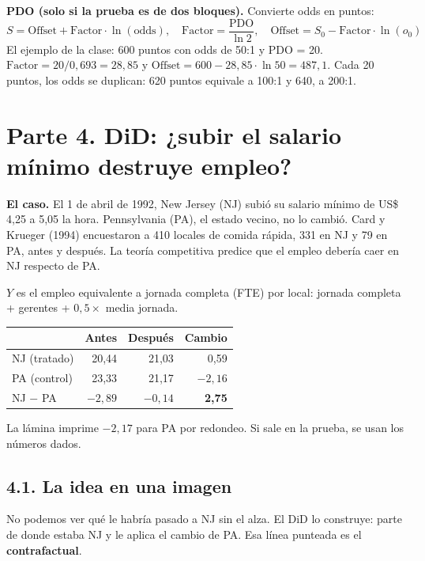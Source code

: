 \documentclass[11pt,letterpaper]{article}
\newcommand{\parte}[1]{\section*{\textcolor{azul}{#1}}}
\newcommand{\tema}[1]{\subsection*{#1}}
\begin{document}
\textbf{PDO (solo si la prueba es de dos bloques).} Convierte odds en puntos:
\[
S=\text{Offset}+\text{Factor}\cdot\ln(\text{odds}),\quad \text{Factor}=\frac{\text{PDO}}{\ln 2},\quad \text{Offset}=S_0-\text{Factor}\cdot\ln(o_0)
\]
El ejemplo de la clase: 600 puntos con odds de 50:1 y PDO = 20. $\text{Factor}=20/0{,}693=28{,}85$ y $\text{Offset}=600-28{,}85\cdot\ln 50=487{,}1$. Cada 20 puntos, los odds se duplican: 620 puntos equivale a 100:1 y 640, a 200:1.

\parte{Parte 4. DiD: ¿subir el salario mínimo destruye empleo?}

\textbf{El caso.} El 1 de abril de 1992, New Jersey (NJ) subió su salario mínimo de US\$ 4,25 a 5,05 la hora. Pennsylvania (PA), el estado vecino, no lo cambió. Card y Krueger (1994) encuestaron a 410 locales de comida rápida, 331 en NJ y 79 en PA, antes y después. La teoría competitiva predice que el empleo debería caer en NJ respecto de PA.

$Y$ es el empleo equivalente a jornada completa (FTE) por local: jornada completa + gerentes + $0{,}5\times$ media jornada.

\begin{center}
\begin{tabular}{lrrr}
\toprule
& \textbf{Antes} & \textbf{Después} & \textbf{Cambio} \\
\midrule
NJ (tratado) & 20,44 & 21,03 & 0,59 \\
PA (control) & 23,33 & 21,17 & $-2{,}16$ \\
\midrule
NJ $-$ PA & $-2{,}89$ & $-0{,}14$ & \textbf{2,75} \\
\bottomrule
\end{tabular}
\end{center}

\small La lámina imprime $-2{,}17$ para PA por redondeo. Si sale en la prueba, se usan los números dados.\normalsize

\tema{4.1. La idea en una imagen}

No podemos ver qué le habría pasado a NJ sin el alza. El DiD lo construye: parte de donde estaba NJ y le aplica el cambio de PA. Esa línea punteada es el \textbf{contrafactual}.

\begin{center}
\end{center}
\end{document}
